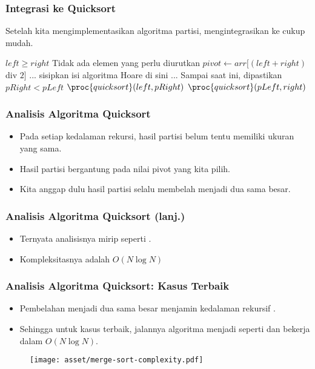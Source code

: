 \begin{frame}
\frametitle{Integrasi ke Quicksort}
Setelah kita mengimplementasikan algoritma partisi, mengintegrasikan ke \fquickSort cukup mudah.
\begin{codebox}
\li \If $left \geq right$ \Then 
\li   \Comment Tidak ada elemen yang perlu diurutkan
\li \Else
\li    $pivot \gets arr[(left + right)$ div $2]$
\zi
\li    \Comment ... sisipkan isi algoritma Hoare di sini ...
\li    \Comment Sampai saat ini, dipastikan $pRight < pLeft$
\zi
\li    $\proc{quicksort}(left, pRight)$
\li    $\proc{quicksort}(pLeft, right)$
    \End
\end{codebox}
\end{frame}

\begin{frame}
\frametitle{Analisis Algoritma Quicksort}
\begin{itemize}
  \item Pada setiap kedalaman rekursi, \farray hasil partisi belum tentu memiliki ukuran yang sama.
  \item Hasil partisi bergantung pada nilai pivot yang kita pilih.
  \item Kita anggap dulu hasil partisi selalu membelah \farray menjadi dua \fsubarray sama besar.
\end{itemize}
\end{frame}

\begin{frame}
\frametitle{Analisis Algoritma Quicksort (lanj.)}
\begin{itemize}
  \item Ternyata analisisnya mirip seperti \fmergeSort.
  \item Kompleksitasnya adalah $O(N \log{N})$
\end{itemize}

\end{frame}

\begin{frame}
\frametitle{Analisis Algoritma Quicksort: Kasus Terbaik}
\begin{itemize}
  \item Pembelahan menjadi dua \fsubarray sama besar menjamin kedalaman rekursif .
  \item Sehingga untuk kasus terbaik, jalannya algoritma menjadi seperti \fmergeSort dan bekerja dalam $O(N \log{N})$.
\end{itemize}
\begin{figure}
  \centering
  \texttt{[image: asset/merge-sort-complexity.pdf]}
\end{figure}
\end{frame}
  
